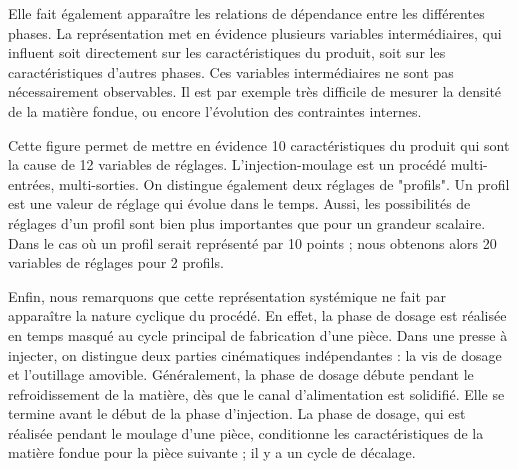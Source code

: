 Elle fait également apparaître les relations de dépendance entre les différentes phases.
La représentation met en évidence plusieurs variables intermédiaires, qui influent soit directement sur les caractéristiques du produit, soit sur les caractéristiques d'autres phases.
Ces variables intermédiaires ne sont pas nécessairement observables.
Il est par exemple très difficile de mesurer la densité de la matière fondue, ou encore l'évolution des contraintes internes.

Cette figure permet de mettre en évidence 10 caractéristiques du produit qui sont la cause de 12 variables de réglages.
L'injection-moulage est un procédé multi-entrées, multi-sorties.
On distingue également deux réglages de "profils".
Un profil est une valeur de réglage qui évolue dans le temps.
Aussi, les possibilités de réglages d'un profil sont bien plus importantes que pour un grandeur scalaire. Dans le cas où un profil serait représenté par 10 points ; nous obtenons alors 20 variables de réglages pour 2 profils.


Enfin, nous remarquons que cette représentation systémique ne fait par apparaître la nature cyclique du procédé.
En effet, la phase de dosage est réalisée en temps masqué au cycle principal de fabrication d'une pièce.
Dans une presse à injecter, on distingue deux parties cinématiques indépendantes : la vis de dosage et l'outillage amovible.
Généralement, la phase de dosage débute pendant le refroidissement de la matière, dès que le canal d’alimentation est solidifié.
Elle se termine avant le début de la phase d'injection.
La phase de dosage, qui est réalisée pendant le moulage d'une pièce, conditionne les caractéristiques de la matière fondue pour la pièce suivante ; il y a un cycle de décalage.

